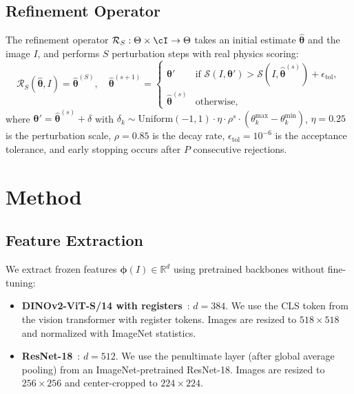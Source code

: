 \documentclass[11pt,a4paper]{article}
\newcommand{\btheta}{\boldsymbol{\theta}}
\newcommand{\bphi}{\boldsymbol{\phi}}
\newcommand{\cS}{\mathcal{S}}
\newcommand{\cR}{\mathcal{R}}
\newcommand{\Real}{\mathbb{R}}
\begin{document}
\subsection{Refinement Operator}

The refinement operator $\cR_S: \Theta \times \cI \to \Theta$ takes an initial
estimate $\hat{\btheta}$ and the image $I$, and performs $S$ perturbation steps
with real physics scoring:
\begin{equation}
\cR_S(\hat{\btheta}, I) = \hat{\btheta}^{(S)}, \quad
\hat{\btheta}^{(s+1)} = \begin{cases}
\btheta' & \text{if } \cS(I, \btheta') > \cS(I, \hat{\btheta}^{(s)}) + \epsilon_\text{tol}, \\
\hat{\btheta}^{(s)} & \text{otherwise},
\end{cases}
\end{equation}
where $\btheta' = \hat{\btheta}^{(s)} + \delta$ with
$\delta_k \sim \text{Uniform}(-1, 1) \cdot \eta \cdot \rho^s \cdot (\theta_k^\text{max} - \theta_k^\text{min})$,
$\eta = 0.25$ is the perturbation scale, $\rho = 0.85$ is the decay rate,
$\epsilon_\text{tol} = 10^{-6}$ is the acceptance tolerance,
and early stopping occurs after $P$ consecutive rejections.

\section{Method}
\label{sec:method}

\subsection{Feature Extraction}

We extract frozen features $\bphi(I) \in \Real^d$ using pretrained backbones
without fine-tuning:
\begin{itemize}[leftmargin=*,itemsep=2pt]
\item \textbf{DINOv2-ViT-S/14 with registers}~\cite{oquab2024dinov2,darcet2024vision}:
  $d=384$. We use the CLS token from the vision transformer with register tokens.
  Images are resized to $518 \times 518$ and normalized with ImageNet statistics.

\item \textbf{ResNet-18}~\cite{he2016deep}: $d=512$. We use the penultimate layer
  (after global average pooling) from an ImageNet-pretrained ResNet-18.
  Images are resized to $256 \times 256$ and center-cropped to $224 \times 224$.
\end{itemize}
\end{document}
